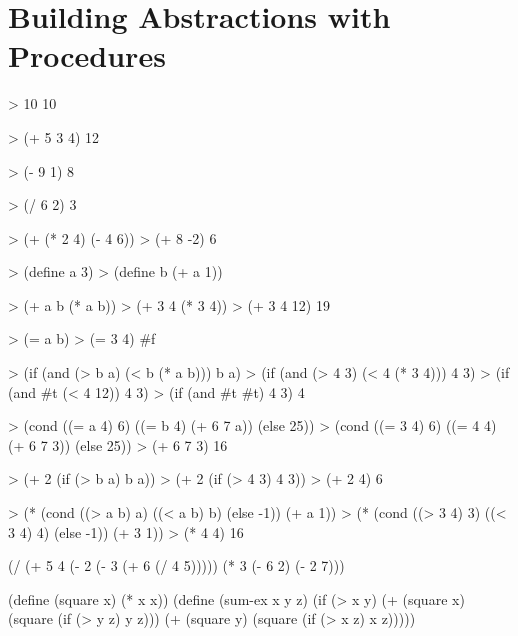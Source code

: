 \chapter{\Large{Building Abstractions with Procedures}}
\begin{lisp}
> 10
10
\end{lisp}
\begin{lisp}
> (+ 5 3 4)
12
\end{lisp}
\begin{lisp}
> (- 9 1)
8
\end{lisp}
\begin{lisp}
> (/ 6 2)
3
\end{lisp}
\begin{lisp}
> (+ (* 2 4) (- 4 6))
> (+ 8 -2)
6
\end{lisp}
\begin{lisp}
> (define a 3)
> (define b (+ a 1))
\end{lisp}
\begin{lisp}
> (+ a b (* a b))
> (+ 3 4 (* 3 4))
> (+ 3 4 12)
19
\end{lisp}
\begin{lisp}
> (= a b)
> (= 3 4)
#f
\end{lisp}
\begin{lisp}
> (if (and (> b a) (< b (* a b))) b a)
> (if (and (> 4 3) (< 4 (* 3 4))) 4 3)
> (if (and #t (< 4 12)) 4 3)
> (if (and #t #t) 4 3)
4
\end{lisp}
\begin{lisp}
> (cond ((= a 4) 6)
        ((= b 4) (+ 6 7 a))
        (else 25))
> (cond ((= 3 4) 6)
        ((= 4 4) (+ 6 7 3))
        (else 25))
> (+ 6 7 3)
16
\end{lisp}
\begin{lisp}
> (+ 2 (if (> b a) b a))
> (+ 2 (if (> 4 3) 4 3))
> (+ 2 4)
6
\end{lisp}
\begin{lisp}
> (* (cond ((> a b) a)
           ((< a b) b)
           (else -1))
     (+ a 1))
> (* (cond ((> 3 4) 3)
           ((< 3 4) 4)
           (else -1))
     (+ 3 1))
> (* 4 4)
16
\end{lisp}

\begin{lisp}
(/ (+ 5 4
      (- 2
         (- 3
            (+ 6 (/ 4 5)))))
   (* 3
      (- 6 2)
      (- 2 7)))
\end{lisp}

\begin{lisp}
(define (square x) (* x x))
(define (sum-ex x y z)
  (if (> x y)
      (+ (square x) (square (if (> y z) y z)))
      (+ (square y) (square (if (> x z) x z)))))
\end{lisp}

